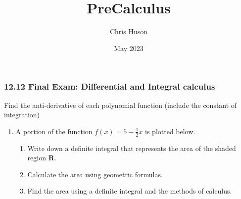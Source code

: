 \documentclass[12pt, twoside]{article}
\title{PreCalculus}
\author{Chris Huson}
\date{May 2023}
\begin{document}
\subsubsection*{12.12 Final Exam: Differential and Integral calculus}

Find the anti-derivative of each polynomial function (include the constant of integration)

\begin{enumerate}
 \vspace{1cm}


\item A portion of the function $f(x)=5-\frac{1}{2}x$ is plotted below.
    \begin{enumerate}
      \item Write down a definite integral that represents the area of the shaded region $\mathbf{R}$. \vspace{1.5cm}
      \item Calculate the area using geometric formulas.
        \begin{flushright}
        \end{flushright}
      \item Find the area using a definite integral and the methods of calculus. \vspace{2cm}
    \end{enumerate}


\end{enumerate}
\end{document}
